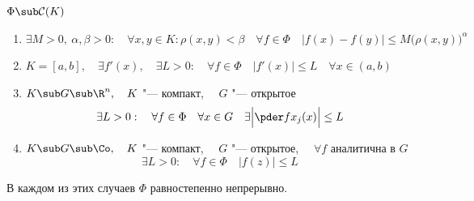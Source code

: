 \begin{theorem}
	$ \Phi \sub \mathcal C(K) $

	\begin{enumerate}
		\item $ \exists M > 0, ~ \alpha, \beta > 0 : \quad
			\forall x, y \in K : \rho(x, y) < \beta \quad \forall f \in \Phi \quad
			|f(x) - f(y)| \le M \bigl( \rho(x, y) \bigr)^\alpha $
		\item $ K = [a, b], \quad
			\exists f'(x), \quad
			\exists L > 0 : \quad \forall f \in \Phi \quad
			|f'(x)| \le L \quad \forall x \in (a, b) $
		\item $ K \sub G \sub \R^n, \quad
			K $ "--- компакт, $ \quad
			G $ "--- открытое
			$$ \exists L > 0 : \quad \forall f \in \Phi \quad
			\forall x \in G \quad \exists \Bigl| \pder f{x_j}(x) \Bigr| \le L $$
		\item $ K \sub G \sub \Co, \quad
			K $ "--- компакт, $ \quad
			G $ "--- открытое, $ \quad
			\forall f $ аналитична в $ G $
			$$ \exists L > 0 : \quad \forall f \in \Phi \quad |f(z)| \le L $$
	\end{enumerate}

	В каждом из этих случаев $ \Phi $ равностепенно непрерывно.
\end{theorem}

